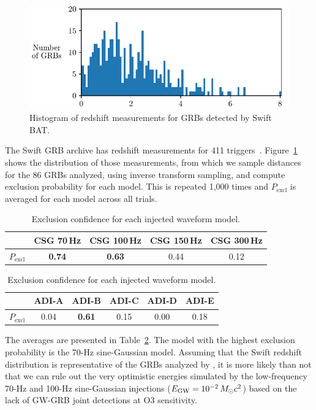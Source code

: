 \begin{figure}[h]
  \centering
  \includegraphics{figures/grb/redshifts.pdf}
  \caption{Histogram of redshift measurements for GRBs detected by Swift BAT.}
  \label{fig:grb-o3b-redshifts}
\end{figure}

The Swift GRB archive has redshift measurements for 411 triggers~\cite{swift_archive}.
Figure~\ref{fig:grb-o3b-redshifts} shows the distribution of those measurements, from which we sample distances for the 86 GRBs analyzed, using inverse transform sampling, and compute exclusion probability for each model.
This is repeated 1,000 times and $P_{\text{excl}}$ is averaged for each model across all trials.

\begin{table}[h]
  \hspace{0.5cm}
  \caption
  {\label{tab:grb-o3b-model-exclusion} Exclusion confidence for each injected waveform model.}
  \begin{tabular}{c c c c c}
    \hline
    \hline
    \rule{0pt}{4ex}
    & CSG 70\,Hz & CSG 100\,Hz & CSG 150\,Hz & CSG 300\,Hz \\
    \hline
    \rule[-2ex]{0pt}{4ex}
		$P_{\text{excl}}$ & \textbf{0.74} & \textbf{0.63} & 0.44 & 0.12
  \end{tabular}
  \begin{tabular}{c c c c c c}
    \hline
    \hline
    \rule{0pt}{4ex}
    & ADI-A & ADI-B & ADI-C & ADI-D & ADI-E \\
    \hline
    \rule[-2ex]{0pt}{4ex}
    $P_{\text{excl}}$ & 0.04 & \textbf{0.61} & 0.15 & 0.00 & 0.18 \\
    \hline
  \end{tabular}
\end{table}

The averages are presented in Table~\ref{tab:grb-o3b-model-exclusion}.
The model with the highest exclusion probability is the 70-Hz sine-Gaussian model.
Assuming that the Swift redshift distribution is representative of the GRBs analyzed by \xpip, it is more likely than not that we can rule out the very optimistic energies simulated by the low-frequency 70-Hz and 100-Hz sine-Gaussian injections ($E_{\text{GW}} = 10^{-2}\,M_{\odot} c^2$) based on the lack of GW-GRB joint detections at O3 sensitivity.

